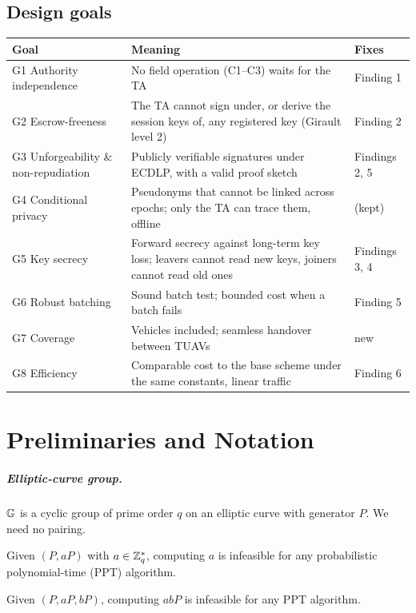 \section{Design goals}
\begin{center}\small
\begin{tabularx}{\linewidth}{@{}l>{\raggedright\arraybackslash}X l@{}}
\toprule
Goal & Meaning & Fixes\\
\midrule
G1 Authority independence & No field operation (C1--C3) waits for the TA & Finding 1\\
G2 Escrow-freeness & The TA cannot sign under, or derive the session keys of, any registered key (Girault level 2) & Finding 2\\
G3 Unforgeability \& non-repudiation & Publicly verifiable signatures under ECDLP, with a valid proof sketch & Findings 2, 5\\
G4 Conditional privacy & Pseudonyms that cannot be linked across epochs; only the TA can trace them, offline & (kept)\\
G5 Key secrecy & Forward secrecy against long-term key loss; leavers cannot read new keys, joiners cannot read old ones & Findings 3, 4\\
G6 Robust batching & Sound batch test; bounded cost when a batch fails & Finding 5\\
G7 Coverage & Vehicles included; seamless handover between TUAVs & new\\
G8 Efficiency & Comparable cost to the base scheme under the same constants, linear traffic & Finding 6\\
\bottomrule
\end{tabularx}
\end{center}

\chapter{Preliminaries and Notation}\label{sec:prelim}
\paragraph{Elliptic-curve group.} $\mathbb{G}$ is a cyclic group of prime order $q$ on an elliptic curve with generator $P$. We need no pairing.
\begin{definition}[ECDLP]
Given $(P,aP)$ with $a\in\mathbb{Z}_q^{*}$, computing $a$ is infeasible for any probabilistic polynomial-time (PPT) algorithm.
\end{definition}
\begin{definition}[CDH]
Given $(P,aP,bP)$, computing $abP$ is infeasible for any PPT algorithm.
\end{definition}

